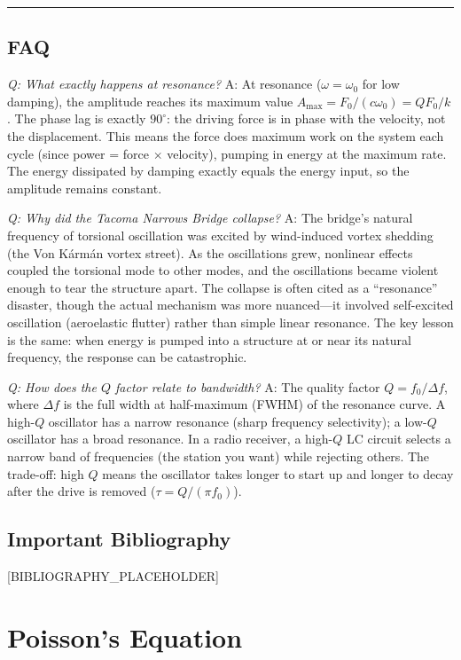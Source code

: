 \documentclass[11pt,openright]{book}
\begin{document}
\bigskip
\hrule
\bigskip
\section*{FAQ}

\textit{Q: What exactly happens at resonance?}
A: At resonance ($\omega = \omega_0$ for low damping), the amplitude reaches its maximum value $A_{\text{max}} = F_0/(c\omega_0) = QF_0/k$. The phase lag is exactly $90^\circ$: the driving force is in phase with the velocity, not the displacement. This means the force does maximum work on the system each cycle (since power = force $\times$ velocity), pumping in energy at the maximum rate. The energy dissipated by damping exactly equals the energy input, so the amplitude remains constant.

\textit{Q: Why did the Tacoma Narrows Bridge collapse?}
A: The bridge's natural frequency of torsional oscillation was excited by wind-induced vortex shedding (the Von K\'{a}rm\'{a}n vortex street). As the oscillations grew, nonlinear effects coupled the torsional mode to other modes, and the oscillations became violent enough to tear the structure apart. The collapse is often cited as a ``resonance'' disaster, though the actual mechanism was more nuanced---it involved self-excited oscillation (aeroelastic flutter) rather than simple linear resonance. The key lesson is the same: when energy is pumped into a structure at or near its natural frequency, the response can be catastrophic.

\textit{Q: How does the $Q$ factor relate to bandwidth?}
A: The quality factor $Q = f_0/\Delta f$, where $\Delta f$ is the full width at half-maximum (FWHM) of the resonance curve. A high-$Q$ oscillator has a narrow resonance (sharp frequency selectivity); a low-$Q$ oscillator has a broad resonance. In a radio receiver, a high-$Q$ LC circuit selects a narrow band of frequencies (the station you want) while rejecting others. The trade-off: high $Q$ means the oscillator takes longer to start up and longer to decay after the drive is removed ($\tau = Q/(\pi f_0)$).
\section*{Important Bibliography}

[BIBLIOGRAPHY_PLACEHOLDER]


\chapter{Poisson's Equation}
\end{document}
